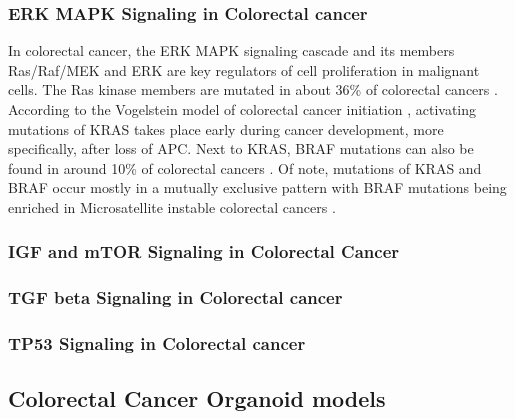 \begin{flushleft}
\subsubsection{ERK MAPK Signaling in Colorectal cancer}


In colorectal cancer, the ERK MAPK signaling cascade and its members Ras/Raf/MEK and ERK are key regulators of cell proliferation in malignant cells. The Ras kinase members are mutated in about 36\% of colorectal cancers \cite{Oncol2005}. According to the Vogelstein model of colorectal cancer initiation \cite{Fearon1989}, activating mutations of KRAS takes place early during cancer development, more specifically, after loss of APC.
Next to KRAS, BRAF mutations can also be found in around 10\% of colorectal cancers \cite{Oncol2005}. Of note, mutations of KRAS and BRAF occur mostly in a mutually exclusive pattern with BRAF mutations being enriched in Microsatellite instable colorectal cancers \cite{Oncol2005, Sahin2013}. 

\subsubsection{IGF and mTOR Signaling in Colorectal Cancer}

\subsubsection{TGF beta Signaling in Colorectal cancer}

\subsubsection{TP53 Signaling in Colorectal cancer}

\subsection{Colorectal Cancer Organoid models}


\end{flushleft}

